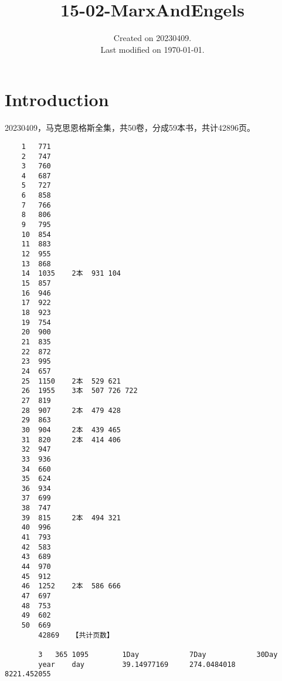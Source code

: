 \documentclass[UTF8]{../../RepresentationUniverse}
\begin{document}
\title{15-02-MarxAndEngels}
\date{Created on 20230409.\\   Last modified on \today.}
\maketitle
\tableofcontents


\chapter{Introduction}

20230409，马克思恩格斯全集，共50卷，分成59本书，共计42896页。


\begin{lstlisting}
    1	771						
    2	747						
    3	760						
    4	687						
    5	727						
    6	858						
    7	766						
    8	806						
    9	795						
    10	854						
    11	883						
    12	955						
    13	868						
    14	1035	2本	931	104			
    15	857						
    16	946						
    17	922						
    18	923						
    19	754						
    20	900						
    21	835						
    22	872						
    23	995						
    24	657						
    25	1150	2本	529	621			
    26	1955	3本	507	726	722		
    27	819						
    28	907	    2本	479	428			
    29	863						
    30	904	    2本	439	465			
    31	820	    2本	414	406			
    32	947						
    33	936						
    34	660						
    35	624						
    36	934						
    37	699						
    38	747						
    39	815	    2本	494	321			
    40	996						
    41	793						
    42	583						
    43	689						
    44	970						
    45	912						
    46	1252	2本	586	666			
    47	697						
    48	753						
    49	602						
    50	669					
        42869   【共计页数】

        3	365	1095	    1Day            7Day 	        30Day 
        year	day        	39.14977169	    274.0484018	    8221.452055
    
\end{lstlisting}
\end{document}
